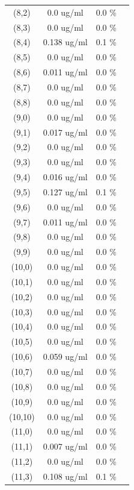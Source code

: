 \documentclass{article}
\begin{document}
\begin{tabular}{c c c c}
(8,2)&        0.0 ug/ml        &0.0 \%\\
(8,3)&        0.0 ug/ml        &0.0 \%\\
(8,4)&        0.138 ug/ml        &0.1 \%\\
(8,5)&        0.0 ug/ml        &0.0 \%\\
(8,6)&        0.011 ug/ml        &0.0 \%\\
(8,7)&        0.0 ug/ml        &0.0 \%\\
(8,8)&        0.0 ug/ml        &0.0 \%\\
(9,0)&        0.0 ug/ml        &0.0 \%\\
(9,1)&        0.017 ug/ml        &0.0 \%\\
(9,2)&        0.0 ug/ml        &0.0 \%\\
(9,3)&        0.0 ug/ml        &0.0 \%\\
(9,4)&        0.016 ug/ml        &0.0 \%\\
(9,5)&        0.127 ug/ml        &0.1 \%\\
(9,6)&        0.0 ug/ml        &0.0 \%\\
(9,7)&        0.011 ug/ml        &0.0 \%\\
(9,8)&        0.0 ug/ml        &0.0 \%\\
(9,9)&        0.0 ug/ml        &0.0 \%\\
(10,0)&        0.0 ug/ml        &0.0 \%\\
(10,1)&        0.0 ug/ml        &0.0 \%\\
(10,2)&        0.0 ug/ml        &0.0 \%\\
(10,3)&        0.0 ug/ml        &0.0 \%\\
(10,4)&        0.0 ug/ml        &0.0 \%\\
(10,5)&        0.0 ug/ml        &0.0 \%\\
(10,6)&        0.059 ug/ml        &0.0 \%\\
(10,7)&        0.0 ug/ml        &0.0 \%\\
(10,8)&        0.0 ug/ml        &0.0 \%\\
(10,9)&        0.0 ug/ml        &0.0 \%\\
(10,10)&        0.0 ug/ml        &0.0 \%\\
(11,0)&        0.0 ug/ml        &0.0 \%\\
(11,1)&        0.007 ug/ml        &0.0 \%\\
(11,2)&        0.0 ug/ml        &0.0 \%\\
(11,3)&        0.108 ug/ml        &0.1 \%\\

\end{tabular}
\end{document}
